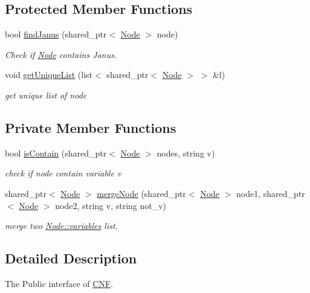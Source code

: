 \subsection*{Protected Member Functions}
\begin{DoxyCompactItemize}
\item 
bool \hyperlink{struct_i___c_n_f_ac9fd631eda1871653b2d1fdcd55f18a5}{find\+Janus} (shared\+\_\+ptr$<$ \hyperlink{class_node}{Node} $>$ node)
\begin{DoxyCompactList}\small\item\em Check if \hyperlink{class_node}{Node} contains Janus. \end{DoxyCompactList}\item 
void \hyperlink{struct_i___c_n_f_ad417af0f07b5e7035c3671dcc3e9f798}{get\+Unique\+List} (list$<$ shared\+\_\+ptr$<$ \hyperlink{class_node}{Node} $>$ $>$ \&l)
\begin{DoxyCompactList}\small\item\em get unique list of node \end{DoxyCompactList}\end{DoxyCompactItemize}
\subsection*{Private Member Functions}
\begin{DoxyCompactItemize}
\item 
bool \hyperlink{struct_i___c_n_f_a41a7be439cae3ed577a30b3f2742218e}{is\+Contain} (shared\+\_\+ptr$<$ \hyperlink{class_node}{Node} $>$ nodes, string v)
\begin{DoxyCompactList}\small\item\em check if node contain variable v \end{DoxyCompactList}\item 
shared\+\_\+ptr$<$ \hyperlink{class_node}{Node} $>$ \hyperlink{struct_i___c_n_f_a62586e691ebfb00696be6bf9710f4da4}{merge\+Node} (shared\+\_\+ptr$<$ \hyperlink{class_node}{Node} $>$ node1, shared\+\_\+ptr$<$ \hyperlink{class_node}{Node} $>$ node2, string v, string not\+\_\+v)
\begin{DoxyCompactList}\small\item\em merge two \hyperlink{class_node_a350b631f3a9192bfa23bc266f6b8da02}{Node\+::variables} list. \end{DoxyCompactList}\end{DoxyCompactItemize}


\subsection{Detailed Description}
The Public interface of \hyperlink{class_c_n_f}{C\+NF}. 

